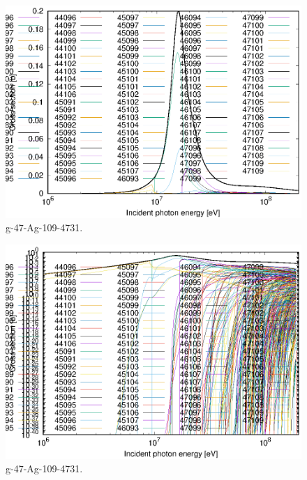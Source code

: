\begin{figure}
 \includegraphics[width=\linewidth]{eps/g_47-Ag-109_4731.eps}
  \caption{g-47-Ag-109-4731.}
\end{figure}
\begin{figure}
 \includegraphics[width=\linewidth]{eps-log/g_47-Ag-109_4731.eps}
 \caption{g-47-Ag-109-4731.}
\end{figure}
\newpage \clearpage

